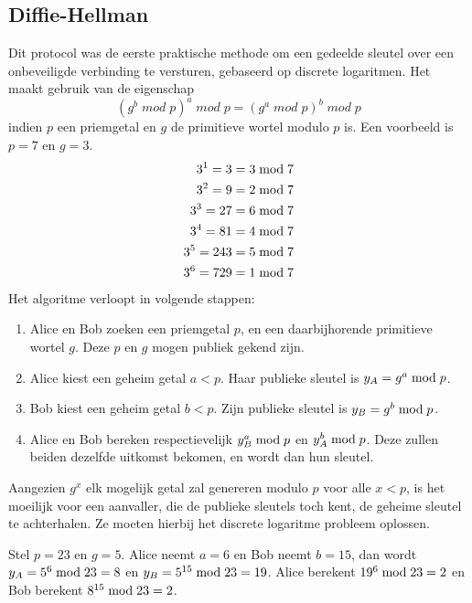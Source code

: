 \documentclass{report}
\begin{document}
	\subsection{Diffie-Hellman}
	Dit protocol was de eerste praktische methode om een gedeelde sleutel over een onbeveiligde verbinding te versturen, gebaseerd op discrete logaritmen. Het maakt gebruik van de eigenschap
	$$(g^b\;mod\;p)^a\;mod\;p = (g^a\;mod\;p)^b\;mod\;p$$ indien $p$ een priemgetal en $g$ de primitieve wortel modulo $p$ is. Een voorbeeld is $p = 7$ en $g = 3$. 
	\begin{equation*}
		\begin{split}
			3^1 = 3 & = 3\;\hbox{mod}\;7\\
			3^2 = 9 & = 2\;\hbox{mod}\;7\\
			3^3 = 27 & = 6\;\hbox{mod}\;7\\
			3^4 = 81 &  = 4\;\hbox{mod}\;7\\
			3^5 = 243  & = 5\;\hbox{mod}\;7\\
			3^6 = 729  & = 1\;\hbox{mod}\;7\\
		\end{split}
	\end{equation*}
	Het algoritme verloopt in volgende stappen:
	\begin{enumerate}
		\item Alice en Bob zoeken een priemgetal $p$, en een daarbijhorende primitieve wortel $g$. Deze $p$ en $g$ mogen publiek gekend zijn.
		\item Alice kiest een geheim getal $a < p$. Haar publieke sleutel is $y_A = g^a\;\hbox{mod}\;p$.
		\item Bob kiest een geheim getal $b < p$. Zijn publieke sleutel is $y_B = g^b\;\hbox{mod}\;p$.
		\item Alice en Bob bereken respectievelijk $y_B^a\;\hbox{mod}\;p$ en $y_A^b\;\hbox{mod}\;p$. Deze zullen beiden dezelfde uitkomst bekomen, en wordt dan hun sleutel. 
	\end{enumerate}
	 Aangezien $g^x$ elk mogelijk getal zal genereren modulo $p$ voor alle $x < p$, is het moeilijk voor een aanvaller, die de publieke sleutels toch kent, de geheime sleutel te achterhalen. Ze moeten hierbij het discrete logaritme probleem oplossen. 
	 
	 Stel $p = 23$ en $g = 5$. Alice neemt $a = 6$ en Bob neemt $b = 15$, dan wordt $y_A = 5^6\;\hbox{mod}\;23 = 8$ en $y_B = 5^{15}\;\hbox{mod}\;23 = 19$. Alice berekent $19^6\;\hbox{mod}\;23 = 2$ en Bob berekent  $8^{15}\;\hbox{mod}\;23 = 2$.
\end{document}
